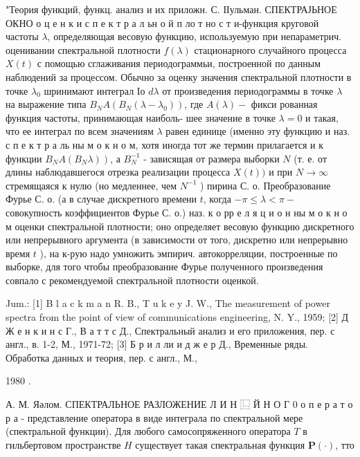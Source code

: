 \documentclass[10pt]{article}
\begin{document}
"Теория функций, функц. анализ и их приложн. С. ІІульман. СПЕКТРАЈЬНОЕ ОКНО о ц е н к и с п е к т р а л ьн о й п ло т но с т и-функция круговой частоты $\lambda$, определяющая весовую функцию, используемую при непараметрич. оценивании спектральной плотности $f(\lambda)$ стационарного случайного процесса $X(t)$ с помощью сглаживания периодограммьи, построенной по данным наблюдений за процессом. Обычно за оценку значения спектральной плотности в точке $\lambda_{0}$ шринимают интеграл Іо $d \lambda$ от произведения периодограммы в точке $\lambda$ на выражение типа $B_{N} A\left(B_{N}\left(\lambda-\lambda_{0}\right)\right)$, где $A(\lambda)-$ фикси рованная функция частоты, принимающая наиболь- шее значение в точке $\lambda=0$ и такая, что ее интеграл по всем значениям $\lambda$ равен единице (именно эту функцию и наз. с п е к т р а ль ны м о к н о м, хотя иногда тот же термин прилагается и к функции $\left.B_{N} A\left(B_{N} \lambda\right)\right)$, а $B_{N}^{-1}$ - зависящая от размера выборки $N$ (т. е. от длины наблюдавшегося отрезка реализации процесса $X(t))$ и при $N \rightarrow \infty$ стремящаяся к нулю (но медленнее, чем $N^{-1}$ ) пирина С. о. Преобразование Фурье С. о. (а в случае дискретного времени $t$, когда $-\pi \leqslant \lambda<\pi-$ совокупность коэффициентов Фурье С. о.) наз. к о рр е л я ц и о н ны м о к н о м оценки спектральной плотности; оно определяет весовую функцию дискретного или непрерывного аргумента (в зависимости от того, дискретно или непрерывно время $t$ ), на к-рую надо умножить эмпирич. автокорреляции, построенные по выборке, для того чтобы преобразование Фурье полученного произведения совпало с рекомендуемой спектральной плотности оценкой.



Jum.: [1] B l a c k m a n R. B., T u k e y J. W., The measurement of power spectra from the point of view of communications engineering, N. Y., 1959; [2] Д Ж е н к и н с Г., В а т т с Д., Спектральный анализ и его приложения, пер. с англ., в. 1-2, М., 1971-72; [3] Б р и л ли и д ж е р Д., Временные ряды. Обработка данных и теория, пер. с англ., М.,

1980 .

А. М. Яәлом. СПЕКТРАЛЬНОЕ РАЗЛОЖЕНИЕ Л И Н $\mathrm{⿺}$ Й Н О Г 0 о п е р а т о р а - представление оператора в виде интеграла по спектральной мере (спектральной функции). Для любого самосопряженного оператора $T$ в гильбертовом пространстве $H$ существует такая спектральная функция $\boldsymbol{P}(\cdot)$, тто
\end{document}
